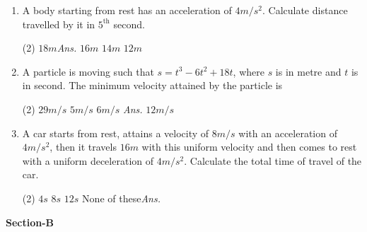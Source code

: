 \documentclass{article}
\newcommand{\ans}{\textcolor{red!95}{\textit{\quad Ans.}}}
\begin{document}
\begin{enumerate}
\item A body starting from rest has an acceleration of $4 m/s^2$. Calculate distance travelled by it in $5^{\text{th}}$ second.
    \begin{tasks}(2)
            \task $18 m$\ans
            \task $16 m$
            \task $14 m$
            \task $12 m$
    \end{tasks}

\item A particle is moving such that $s=t^3-6t^2+18t$, where $s$ is in metre and $t$ is in second. The minimum velocity attained by the particle is
\begin{center}
    \end{center}
    \begin{tasks}(2)
            \task $29 m/s$
            \task $5 m/s$
            \task $6 m/s$ \ans
            \task $12 m/s$
    \end{tasks}

    \item A car starts from rest, attains a velocity of $8 m/s$ with an acceleration of $4 m/s^2$, then it travels $16 m$ with this uniform velocity and then comes to rest with a uniform deceleration of $4 m/s^2$. Calculate the total time of travel of the car.
    \begin{tasks}(2)
         \task $4 s$
         \task $8 s$
         \task $12 s$
         \task None of these\ans
    \end{tasks}

\end{enumerate}


\pagebreak

\begin{center}
\textbf{Section-B}
\end{center}
\end{document}

